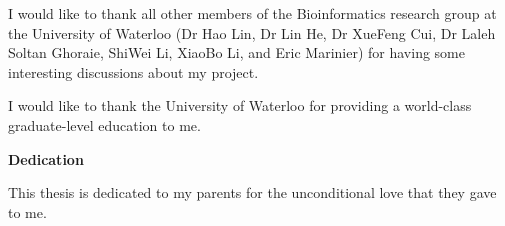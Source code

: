{I would like to thank all other members of the Bioinformatics research group at the University of Waterloo
		(Dr Hao Lin, Dr Lin He, Dr XueFeng Cui, Dr Laleh Soltan Ghoraie, ShiWei Li, XiaoBo Li, and Eric Marinier) 
		for having some interesting discussions about my project.

I would like to thank
		the University of Waterloo
		for providing a world-class graduate-level education to me.



\cleardoublepage
\begin{center}\textbf{Dedication}\end{center}
This thesis is dedicated to my parents for the unconditional love that they gave to me.
\cleardoublepage

}{}

\renewcommand\contentsname{Table of Contents}
\tableofcontents
\cleardoublepage
{}
\listoftables
\cleardoublepage
{}		%
\listoffigures
\cleardoublepage
{}		%


 
 \cleardoublepage
 \newpage


\glsresetall
